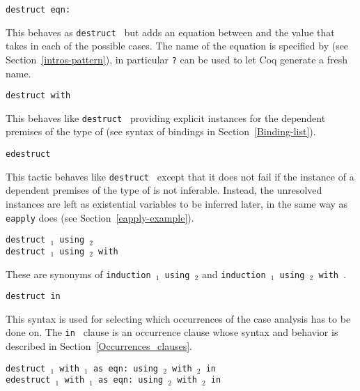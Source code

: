 \begin{coq_example*}
\begin{Variants}
\item{\tt destruct {\term} eqn:{\namingintropattern}}

  This behaves as {\tt destruct {\term}} but adds an equation between
  {\term} and the value that {\term} takes in each of the possible
  cases.  The name of the equation is specified by {\namingintropattern}
  (see Section~\ref{intros-pattern}), in particular {\tt ?} can be
  used to let Coq generate a fresh name.

\item{\tt destruct {\term} with \bindinglist}

  This behaves like \texttt{destruct {\term}} providing explicit
  instances for the dependent premises of the type of {\term} (see
  syntax of bindings in Section~\ref{Binding-list}).

\item{\tt edestruct {\term}}

  This tactic behaves like \texttt{destruct {\term}} except that it
  does not fail if the instance of a dependent premises of the type of
  {\term} is not inferable. Instead, the unresolved instances are left
  as existential variables to be inferred later, in the same way as
  {\tt eapply} does (see Section~\ref{eapply-example}).

\item{\tt destruct {\term$_1$} using {\term$_2$}}\\
     {\tt destruct {\term$_1$} using {\term$_2$} with {\bindinglist}}

  These are synonyms of {\tt induction {\term$_1$} using {\term$_2$}} and
  {\tt induction {\term$_1$} using {\term$_2$} with {\bindinglist}}.

\item \texttt{destruct {\term} in {\occgoalset}}

  This syntax is used for selecting which occurrences of {\term} the
  case analysis has to be done on. The {\tt in {\occgoalset}} clause is an
  occurrence clause whose syntax and behavior is described in
  Section~\ref{Occurrences_clauses}.

\item{\tt destruct {\term$_1$} with {\bindinglist$_1$}
        as {\disjconjintropattern} eqn:{\namingintropattern}
        using {\term$_2$} with {\bindinglist$_2$} in {\occgoalset}}\\
     {\tt edestruct {\term$_1$} with {\bindinglist$_1$}
        as {\disjconjintropattern} eqn:{\namingintropattern}
        using {\term$_2$} with {\bindinglist$_2$} in {\occgoalset}}


\end{Variants}
\end{coq_example*}
